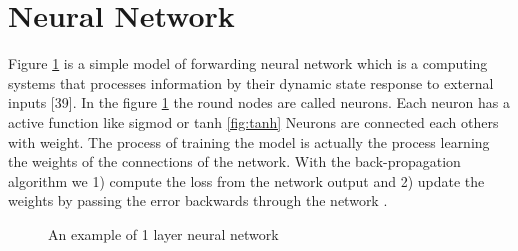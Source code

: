\section{Neural Network} %
Figure \ref{fig:NN} is a simple model of forwarding neural network which is a computing systems that processes information by their dynamic state response to external inputs [39]. In the figure  \ref{fig:NN}  
the round nodes are called neurons. Each neuron has a active function like sigmod or tanh \ref{fig:tanh} Neurons are connected each others with weight. The process of training the model is actually the process learning the weights of the connections of the network. With the back-propagation algorithm we 1) compute the loss from the network
output and 2) update the weights by passing the error
backwards through the network \cite{rumelhart1988learning}.  
\begin{figure}[!h]
\center
\def\layersep{2.5cm}


   \caption{An example of 1 layer neural network}
\label{fig:NN}
\end{figure}
\label{sec:NNsec}

